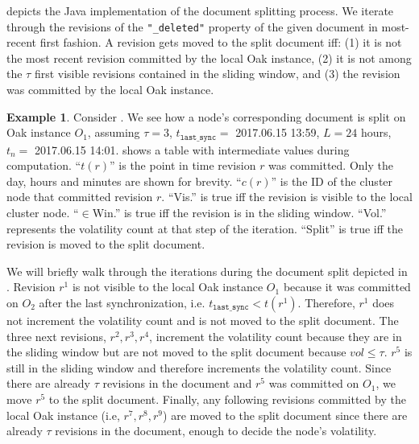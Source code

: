 \documentclass[abstracton,12pt]{scrartcl}
\theoremstyle{definition}
\newtheorem{example}{Example}
\begin{document}
 depicts the Java implementation of the document splitting process.
We iterate through the revisions of the \texttt{"\_deleted"} property of the given document in most-recent first fashion.
A revision gets moved to the split document iff: (1) it is not the most recent revision committed by the local Oak instance, (2) it is not among the $\tau$ first visible revisions contained in the sliding window, and (3) the revision was committed by the local Oak instance.

\begin{example}
    \label{ex:split_doc}
    Consider .
    We see how a node's corresponding document is split on Oak instance $O_1$, assuming $\tau = 3$, $t_{\texttt{last\_sync}} = $ {\footnotesize 2017.06.15 13:59}, $L = 24$ hours, $t_n = $ {\footnotesize 2017.06.15 14:01}.
     shows a table with intermediate values during computation.
    ``$t(r)$'' is the point in time revision $r$ was committed. Only the day, hours and minutes are shown for brevity.
    ``$c(r)$'' is the ID of the cluster node that committed revision $r$.
    ``Vis.'' is true iff the revision is visible to the local cluster node.
    ``$\in$Win.'' is true iff the revision is in the sliding window.
    ``Vol.'' represents the volatility count at that step of the iteration. 
    ``Split'' is true iff the revision is moved to the split document.

    We will briefly walk through the iterations during the document split depicted in .
    Revision $r^1$ is not visible to the local Oak instance $O_1$ because it was committed on $O_2$ after the last synchronization, i.e. $t_{\texttt{last\_sync}} < t(r^1)$.
    Therefore, $r^1$ does not increment the volatility count and is not moved to the split document.
    The three next revisions, $r^2,r^3,r^4$, increment the volatility count because they are in the sliding window but are not moved to the split document because $vol \leq \tau$.
    $r^5$ is still in the sliding window and therefore increments the volatility count.
    Since there are already $\tau$ revisions in the document and $r^5$ was committed on $O_1$, we move $r^5$ to the split document.
    Finally, any following revisions committed by the local Oak instance (i.e, $r^7, r^8, r^9$) are moved to the split document since there are already $\tau$ revisions in the document, enough to decide the node's volatility.
\end{example}
\end{document}
